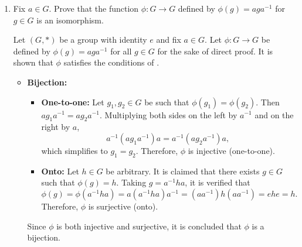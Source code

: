 \begin{enumerate}
\begin{enumerate}
\begin{subprove}
      Next, it is shown that $k$ is the least positive integer with this property.
      Suppose, for contradiction, that there exists a positive integer $m < k$ such that $(\phi(g))^m = f$.
      Then, since $\phi$ preserves the group operation and is bijective,
      \[
        \phi(g^m) = (\phi(g))^m = f = \phi(e).
      \]
      Since $\phi$ is injective (one-to-one), it follows that $g^m = e$.
      However, this contradicts the assumption that $k$ is the least positive integer such that $g^k = e$, 
      since $m < k$ and $g^m = e$.
      
      Therefore, $k$ is the least positive integer such that $(\phi(g))^k = f$.
      By definition of , it is concluded that $\phi(g)$ has order $k$ in $H$.
    \end{subprove}
  \end{enumerate}




  \newpage



  \item Fix $a \in G$. Prove that the function $\phi: G \rightarrow G$ defined by $\phi(g)=a g a^{-1}$ for $g \in G$ is an isomorphism.
  \begin{subprove}
    Let $(G, *)$ be a group with identity $e$ and fix $a \in G$.
    Let $\phi: G \to G$ be defined by $\phi(g) = a g a^{-1}$ for all $g \in G$ for the sake of direct proof.
    It is shown that $\phi$ satisfies the conditions of .
    
    \begin{itemize}
      \item \textbf{Bijection:}
      \begin{itemize}
        \item \textbf{One-to-one:} Let $g_1, g_2 \in G$ be such that $\phi(g_1) = \phi(g_2)$.
        Then $a g_1 a^{-1} = a g_2 a^{-1}$.
        Multiplying both sides on the left by $a^{-1}$ and on the right by $a$,
        \[
          a^{-1} (a g_1 a^{-1}) a = a^{-1} (a g_2 a^{-1}) a,
        \]
        which simplifies to $g_1 = g_2$.
        Therefore, $\phi$ is injective (one-to-one).
        
        \item \textbf{Onto:} Let $h \in G$ be arbitrary.
        It is claimed that there exists $g \in G$ such that $\phi(g) = h$.
        Taking $g = a^{-1} h a$, it is verified that
        \[
          \phi(g) = \phi(a^{-1} h a) = a (a^{-1} h a) a^{-1} = (a a^{-1}) h (a a^{-1}) = e h e = h.
        \]
        Therefore, $\phi$ is surjective (onto).
      \end{itemize}
      Since $\phi$ is both injective and surjective, it is concluded that $\phi$ is a bijection.
      

\end{itemize}
\end{subprove}
\end{enumerate}
